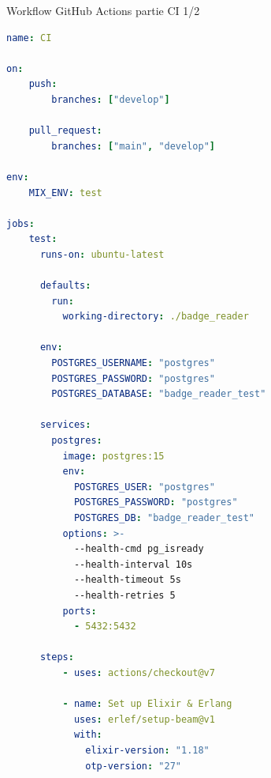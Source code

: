 \begin{for_you}{Workflow GitHub Actions partie CI 1/2}
\begin{lstlisting}[language=yaml]
name: CI

on:
    push:
        branches: ["develop"]
    
    pull_request:
        branches: ["main", "develop"] 

env:
    MIX_ENV: test

jobs:
    test:
      runs-on: ubuntu-latest

      defaults:
        run:
          working-directory: ./badge_reader

      env:
        POSTGRES_USERNAME: "postgres"
        POSTGRES_PASSWORD: "postgres"
        POSTGRES_DATABASE: "badge_reader_test"

      services:
        postgres:
          image: postgres:15
          env:
            POSTGRES_USER: "postgres"
            POSTGRES_PASSWORD: "postgres"
            POSTGRES_DB: "badge_reader_test"
          options: >-
            --health-cmd pg_isready
            --health-interval 10s
            --health-timeout 5s
            --health-retries 5
          ports:
            - 5432:5432
      
      steps:
          - uses: actions/checkout@v7 

          - name: Set up Elixir & Erlang
            uses: erlef/setup-beam@v1
            with:
              elixir-version: "1.18"
              otp-version: "27"
\end{lstlisting}
\end{for_you}

